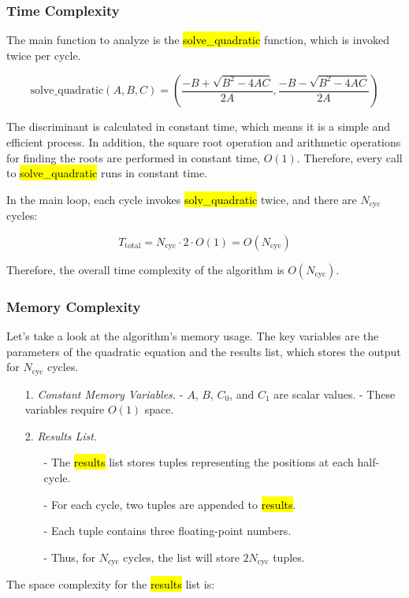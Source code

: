 \documentclass[12pt, a4paper, oneside]{report}
\begin{document}
\subsubsection{Time Complexity}

The main function to analyze is the \hl{solve\_quadratic} function, which is invoked twice per cycle.

\[
	\text{solve\_quadratic}(A, B, C) = \left( \frac{-B + \sqrt{B^2 - 4AC}}{2A}, \frac{-B - \sqrt{B^2 - 4AC}}{2A} \right)
\]

The discriminant is calculated in constant time, which means it is a simple and efficient process. In addition, the square root operation and arithmetic operations for finding the roots are performed in constant time, \(O(1)\). Therefore, every call to \hl{solve\_quadratic} runs in constant time.

In the main loop, each cycle invokes \hl{solv\_quadratic} twice, and there are \(N_{\text{cyc}}\) cycles:

\[
	T_{\text{total}} = N_{\text{cyc}} \cdot 2 \cdot O(1) = O(N_{\text{cyc}})
\]

Therefore, the overall time complexity of the algorithm is \(O(N_{\text{cyc}})\).

\subsubsection{Memory Complexity}

Let's take a look at the algorithm's memory usage. The key variables are the parameters of the quadratic equation and the results list, which stores the output for \(N_{\text{cyc}}\) cycles.

\begin{itemize}
	\item[1.]  \textit{Constant Memory Variables.}
	      - \(A\), \(B\), \(C_0\), and \(C_1\) are scalar values.
	      - These variables require \(O(1)\) space.

	\item[2.]  \textit{Results List.}
	      \begin{itemize}
		      \item[-] The \hl{results} list stores tuples representing the positions at each half-cycle.
		      \item[-] For each cycle, two tuples are appended to \hl{results}.
		      \item[-] Each tuple contains three floating-point numbers.
		      \item[-] Thus, for \(N_{\text{cyc}}\) cycles, the list will store \(2N_{\text{cyc}}\) tuples.
	      \end{itemize}
\end{itemize}
The space complexity for the \hl{results} list is:
\end{document}
